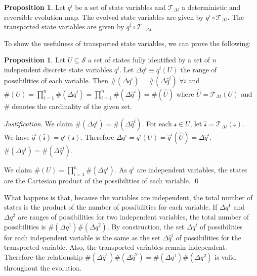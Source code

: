 \documentclass[aps,pra,10pt,twocolumn,floatfix,nofootinbib]{revtex4-1}
\numberwithin{equation}{section}
\theoremstyle{definition}
\newtheorem{prop}[equation]{Proposition}
\newenvironment{justification}{\emph{Justification}.}{\qed}
\begin{document}
\begin{prop}\label{evolved_transported_variable}
Let $q^i$ be a set of state variables and $\mathcal{T}_{\Delta t}$ a deterministic and reversible evolution map. The evolved state variables are given by $q^i \circ \mathcal{T}_{\Delta t}$. The transported state variables are given by $q^i \circ \mathcal{T}_{-\Delta t}$.
\end{prop}

To show the usefulness of transported state variables, we can prove the following:

\begin{prop}\label{discrete_state_metric}
	Let $U \subseteq \mathcal{S}$ a set of states fully identified by a set of $n$ independent discrete state variables $q^i$. Let $\Delta q^i \equiv q^i(U)$ the range of possibilities of each variable. Then $\#(\Delta q^i)=\#(\Delta \hat{q}^i) \; \forall i$ and $\#(U)=\prod\limits_{i=1}^{n}\#(\Delta q^i)=\prod\limits_{i=1}^{n}\#(\Delta \hat{q}^i)=\#(\hat{U})$ where $\hat{U}=\mathcal{T}_{\Delta t}(U)$ and $\#$ denotes the cardinality of the given set.
\end{prop}

\begin{justification}
	We claim $\#(\Delta q^i)=\#(\Delta \hat{q}^i)$. For each $\mathcal{s} \in U$, let $\hat{\mathcal{s}}=\mathcal{T}_{\Delta t}(\mathcal{s})$. We have $\hat{q}^i(\hat{\mathcal{s}}) = q^i(\mathcal{s})$. Therefore $\Delta q^i = q^i(U) = \hat{q}^i(\hat{U})=\Delta \hat{q}^i$. $\#(\Delta q^i)=\#(\Delta \hat{q}^i)$.
	
	We claim $\#(U)=\prod\limits_{i=1}^{n}\#(\Delta q^i)$. As $q^i$ are independent variables, the states are the Cartesian product of the possibilities of each variable.
\end{justification}

What happens is that, because the variables are independent, the total number of states is the product of the number of possibilities for each variable. If $\Delta q^1$ and $\Delta q^2$ are ranges of possibilities for two independent variables, the total number of possibilities is $\#(\Delta q^1) \#(\Delta q^2)$. By construction, the set $\Delta q^i$ of possibilities for each independent variable is the same as the set $\Delta \hat{q}^i$ of possibilities for the transported variable. Also, the transported variables remain independent. Therefore the relationship $\#(\Delta \hat{q}^1) \#(\Delta \hat{q}^2) = \#(\Delta q^1) \#(\Delta q^2)$ is valid throughout the evolution.
\end{document}
